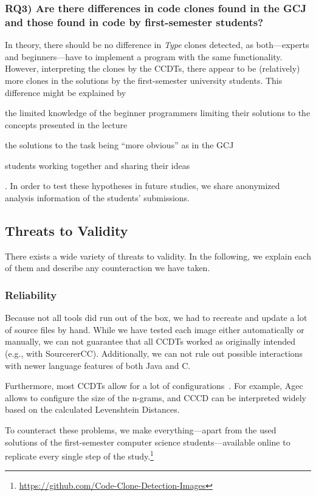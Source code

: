 \documentclass[10pt,journal,compsoc]{IEEEtran}
\def\T#1{\textsl{Type\nobreakdash-#1}}
\newcommand*\urldate[2]{\url{#1}\;\textsuperscript{\color{gray}\DTMdate{#2}}}
\newcommand*\footurl[3][]{\footnote{#1\urldate{#2}{#3}}}
\begin{document}
\subsubsection{RQ3) Are there differences in code clones found in the GCJ and those found in code by first-semester students?}
In theory, there should be no difference in \T4 clones detected, as both---experts and beginners---have to implement a program with the same functionality. However, interpreting the clones by the CCDTs, there appear to be (relatively) more clones in the solutions by the first-semester university students.
This difference might be explained by \begin{orlist}
  \item the limited knowledge of the beginner programmers limiting their solutions to the concepts presented in the lecture
  \item the solutions to the task being \enquote{more obvious} as in the GCJ
  \item students working together and sharing their ideas
\end{orlist}.
In order to test these hypotheses in future studies, we share anonymized analysis information of the students' submissions.

\subsection{Threats to Validity}
There exists a wide variety of threats to validity. In the following, we explain each of them and describe any counteraction we have taken.


\subsubsection{Reliability}
Because not all tools did run out of the box, we had to recreate and update a lot of source files by hand. While we have tested each image either automatically or manually,
we can not guarantee that all CCDTs worked as originally intended (e.g., with SourcererCC).
Additionally, we can not rule out possible interactions with newer language features of both Java and C.

Furthermore, most CCDTs allow for a lot of configurations~\cite{wang2013searching}. For example, Agec allows to configure the size of the n-grams, and CCCD can be interpreted widely based on the calculated Levenshtein Distances.

To counteract these problems, we make everything---apart from the used solutions of the first-semester computer science students---available online to replicate every single step of the study.\footurl{https://github.com/Code-Clone-Detection-Images}{2022-02-13}
\end{document}
